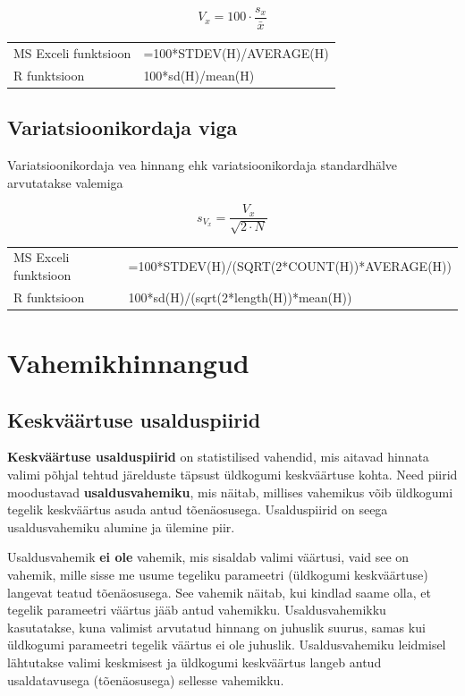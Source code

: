 \documentclass[
]{book}
\begin{document}
\[V_x = 100 \cdot \frac{s_x}{\bar{x}}\]

\begin{tabular}{ll}
MS Exceli funktsioon & =100*STDEV(H)/AVERAGE(H)\\
R funktsioon & 100*sd(H)/mean(H) \\
\end{tabular}

\subsection{Variatsioonikordaja viga}\label{variatsioonikordaja-viga}

Variatsioonikordaja vea hinnang ehk variatsioonikordaja standardhälve arvutatakse valemiga

\[s_{V_x} = \frac{V_x}{\sqrt{2 \cdot N}}\]

\begin{tabular}{ll}
MS Exceli funktsioon & =100*STDEV(H)/(SQRT(2*COUNT(H))*AVERAGE(H)) \\
R funktsioon & 100*sd(H)/(sqrt(2*length(H))*mean(H)) \\
\end{tabular}

\section{Vahemikhinnangud}\label{vahemikhinnangud}

\subsection{Keskväärtuse usalduspiirid}\label{keskvuxe4uxe4rtuse-usalduspiirid}

\textbf{Keskväärtuse usalduspiirid} on statistilised vahendid, mis aitavad hinnata valimi põhjal tehtud järelduste täpsust üldkogumi keskväärtuse kohta. Need piirid moodustavad \textbf{usaldusvahemiku}, mis näitab, millises vahemikus võib üldkogumi tegelik keskväärtus asuda antud tõenäosusega. Usalduspiirid on seega usaldusvahemiku alumine ja ülemine piir.

Usaldusvahemik \textbf{ei ole} vahemik, mis sisaldab valimi väärtusi, vaid see on vahemik, mille sisse me usume tegeliku parameetri (üldkogumi keskväärtuse) langevat teatud tõenäosusega. See vahemik näitab, kui kindlad saame olla, et tegelik parameetri väärtus jääb antud vahemikku. Usaldusvahemikku kasutatakse, kuna valimist arvutatud hinnang on juhuslik suurus, samas kui üldkogumi parameetri tegelik väärtus ei ole juhuslik. Usaldusvahemiku leidmisel lähtutakse valimi keskmisest ja üldkogumi keskväärtus langeb antud usaldatavusega (tõenäosusega) sellesse vahemikku.
\end{document}
